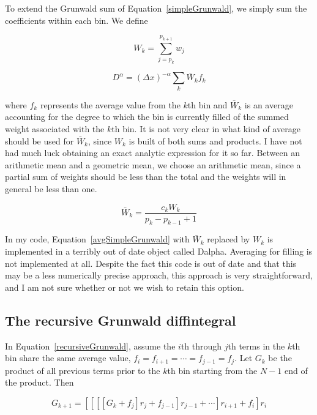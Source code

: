 \documentclass[12]{article}
\begin{document}
To extend the Grunwald sum of Equation~\ref{simpleGrunwald}, we simply
sum the coefficients within each bin. We define

\begin{equation}
W_k = \sum_{j=p_k}^{p_{k+1}} w_j
\label{sumWk}
\end{equation}

\begin{equation}
D^\alpha = (\Delta x)^{-\alpha}\sum_{k}\bar{W}_kf_k
\label{avgSimpleGrunwald}
\end{equation}

\noindent where $f_k$ represents the average value from the $k$th bin
and $\bar{W}_k$ is an average accounting for the degree to which the
bin is currently filled of the summed weight associated with the $k$th
bin. It is not very clear in what kind of average should be used for
$\bar{W}_k$, since $W_k$ is built of both sums and products. I have
not had much luck obtaining an exact analytic expression for it so
far. Between an arithmetic mean and a geometric mean, we choose an
arithmetic mean, since a partial sum of weights should be less than
the total and the weights will in general be less than one.

\begin{equation}
\bar{W}_k= \frac{c_k W_k}{p_k-p_{k-1}+1}
\label{Wbar}
\end{equation}

In my code, Equation~\ref{avgSimpleGrunwald} with $\bar{W}_k$ replaced
by $W_k$ is implemented in a terribly out of date object called
Dalpha. Averaging for filling is not implemented at all. Despite the
fact this code is out of date and that this may be a less numerically
precise approach, this approach is very straightforward, and I am not
sure whether or not we wish to retain this option.

\subsection{The recursive Grunwald diffintegral}

In Equation~\ref{recursiveGrunwald}, assume the $i$th through $j$th
terms in the $k$th bin share the same average value,
$f_i=f_{i+1}=\cdots=f_{j-1}=f_j$. Let $G_k$ be the product of all
previous terms prior to the $k$th bin starting from the $N-1$ end of
the product. Then

\begin{equation}
G_{k+1} = [[[[G_k + f_j]r_j+f_{j-1}]r_{j-1}+\cdots ]r_{i+1}+f_i]r_i
\end{equation}
\end{document}

